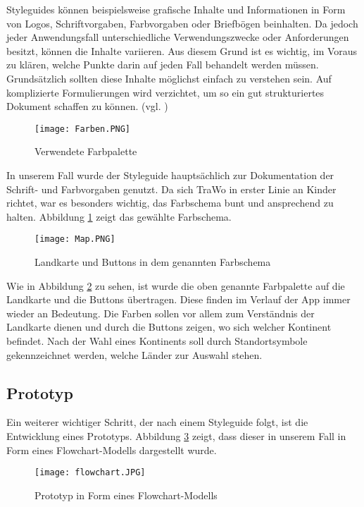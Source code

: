 Styleguides können beispielsweise grafische Inhalte und Informationen in Form von Logos, Schriftvorgaben, Farbvorgaben oder Briefbögen beinhalten. Da jedoch jeder Anwendungsfall unterschiedliche Verwendungszwecke oder Anforderungen besitzt, können die Inhalte variieren. Aus diesem Grund ist es wichtig, im Voraus zu klären, welche Punkte darin auf jeden Fall behandelt werden müssen. Grundsätzlich sollten diese Inhalte möglichst einfach zu verstehen sein. Auf komplizierte Formulierungen wird verzichtet, um so ein gut strukturiertes Dokument schaffen zu können. (vgl. \cite{Styleguide})

\begin{figure} [h]
\centering
\texttt{[image: Farben.PNG]}
\caption{Verwendete Farbpalette}
\label{fig:farben}
\end{figure}

In unserem Fall wurde der Styleguide hauptsächlich zur Dokumentation der Schrift- und Farbvorgaben genutzt. Da sich TraWo in erster Linie an Kinder richtet, war es besonders wichtig, das Farbschema bunt und ansprechend zu halten. Abbildung \ref{fig:farben} zeigt das gewählte Farbschema.

\begin{figure} [h]
\centering
\texttt{[image: Map.PNG]}
\caption{Landkarte und Buttons in dem genannten Farbschema}
\label{fig:map}
\end{figure}

Wie in Abbildung \ref{fig:map} zu sehen, ist wurde die oben genannte Farbpalette auf die Landkarte und die Buttons übertragen. Diese finden im Verlauf der App immer wieder an Bedeutung. Die Farben sollen vor allem zum Verständnis der Landkarte dienen und durch die Buttons zeigen, wo sich welcher Kontinent befindet. Nach der Wahl eines Kontinents soll durch Standortsymbole gekennzeichnet werden, welche Länder zur Auswahl stehen.

\subsection{Prototyp}\label{prototyp}
Ein weiterer wichtiger Schritt, der nach einem Styleguide folgt, ist die Entwicklung eines Prototyps. Abbildung \ref{fig:flowchart} zeigt, dass dieser in unserem Fall in Form eines Flowchart-Modells dargestellt wurde.

\begin{figure} [h]
\centering
\texttt{[image: flowchart.JPG]}
\caption{Prototyp in Form eines Flowchart-Modells}
\label{fig:flowchart}
\end{figure}

